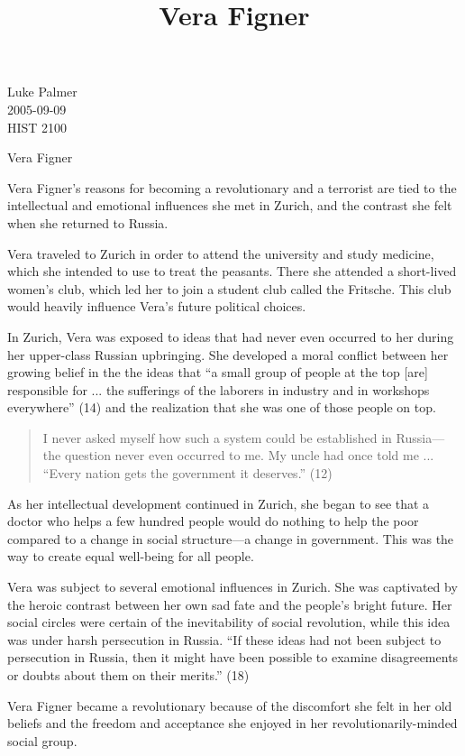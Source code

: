 \documentclass[12pt]{article}
\title{Vera Figner}
\begin{document}
\noindent Luke Palmer \\
2005-09-09 \\
HIST 2100

\begin{center}
\Huge{Vera Figner}
\end{center}

\doublespace

Vera Figner's reasons for becoming a revolutionary and a terrorist are
tied to the intellectual and emotional influences she met in Zurich, and
the contrast she felt when she returned to Russia.

Vera traveled to Zurich in order to attend the university and study
medicine, which she intended to use to treat the peasants.  There she
attended a short-lived women's club, which led her to join a student
club called the Fritsche.  This club would heavily influence Vera's
future political choices.

In Zurich, Vera was exposed to ideas that had never even occurred to her
during her upper-class Russian upbringing.  She developed a moral
conflict between her growing belief in the the ideas that ``a small
group of people at the top [are] responsible for ... the sufferings of
the laborers in industry and in workshops everywhere'' (14) and the
realization that she was one of those people on top. 

\begin{quote}
\singlespace
I never asked myself how such a system could be established in
Russia---the question never even occurred to me.  My uncle had once told
me ... ``Every nation gets the government it deserves.'' (12)
\end{quote} 

As her intellectual development continued in Zurich, she began to see
that a doctor who helps a few hundred people would do nothing to help
the poor compared to a change in social structure---a change in
government.  This was the way to create equal well-being for all people.

Vera was subject to several emotional influences in Zurich.  She was
captivated by the heroic contrast between her own sad fate and the
people's bright future.  Her social circles were certain of the
inevitability of social revolution, while this idea was under harsh
persecution in Russia.  ``If these ideas had not been subject to
persecution in Russia, then it might have been possible to examine
disagreements or doubts about them on their merits.'' (18)

Vera Figner became a revolutionary because of the discomfort she felt in
her old beliefs and the freedom and acceptance she enjoyed in her
revolutionarily-minded social group. 
\end{document}
